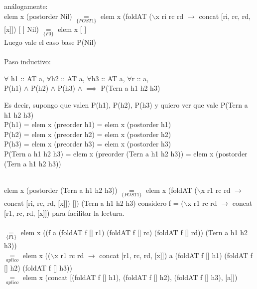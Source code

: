 \documentclass[10pt,a4paper]{article}
\begin{document}
\noindent análogamente: \\
elem x (postorder Nil) $\underset{\{POST1\}}{=}$ elem x (foldAT ($\backslash$x ri rc rd $\rightarrow$ concat [ri, rc, rd, [x]]) [ ] Nil) $\underset{\{F0\}}{=}$ elem x [ ] \\


Luego vale el caso base P(Nil)
\\ \\
Paso inductivo: 
\begin{center}
	$\forall$ h1 :: AT a, $\forall$h2 :: AT a, $\forall$h3 :: AT a, $\forall$r :: a, \\
	P(h1) $\land$ P(h2) $\land$ P(h3) $\land$ $\implies$ P(Tern a h1 h2 h3)
\end{center}
Es decir, supongo que valen P(h1), P(h2), P(h3) y quiero ver que vale P(Tern a h1 h2 h3) \\
P(h1) = elem x (preorder h1) = elem x (postorder h1) \\
P(h2) = elem x (preorder h2) = elem x (postorder h2) \\
P(h3) = elem x (preorder h3) = elem x (postorder h3) \\
P(Tern a h1 h2 h3) = elem x (preorder (Tern a h1 h2 h3)) = elem x (postorder (Tern a h1 h2 h3)) \\
\\
\noindent

elem x (postorder (Tern a h1 h2 h3)) $\underset{\{POST1\}}{=}$ elem x (foldAT ($\backslash$x r1 rc rd $\rightarrow$ concat [ri, rc, rd, [x]]) []) (Tern a h1 h2 h3)
considero f = ($\backslash$x r1 rc rd $\rightarrow$ concat [r1, rc, rd, [x]]) para facilitar la lectura.\\ \\
$\underset{\{F1\}}{=}$ elem x ((f a (foldAT f [] r1) (foldAT f [] rc) (foldAT f [] rd)) (Tern a h1 h2 h3)) \\
$\underset{aplico}{=}$ elem x (($\backslash$x r1 rc rd $\rightarrow$ concat [r1, rc, rd, [x]]) a (foldAT f [] h1) (foldAT f [] h2) (foldAT f [] h3)) \\
$\underset{aplico}{=}$ elem x (concat [(foldAT f [] h1), (foldAT f [] h2), (foldAT f [] h3), [a]]) \\
\end{document}
